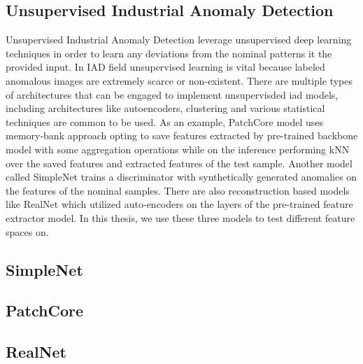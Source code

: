 \subsection{Unsupervised Industrial Anomaly Detection}
\label{unsupervised iad}

Unsupervised Industrial Anomaly Detection leverage unsupervised deep learning techniques in order to learn any deviations from the nominal patterns it the provided input. In IAD field unsupervised learning is vital because labeled anomalous images are extremely scarce or non-existent. There are multiple types of architectures that can be engaged to implement unsupervisded iad models, including architectures like autoencoders, clustering and various statistical techniques are common to be used. As an example, PatchCore model uses memory-bank approach opting to save features extracted by pre-trained backbone model with some aggregation operations while on the inference performing kNN over the saved features and extracted features of the test sample. Another model called SimpleNet trains a discriminator with synthetically generated anomalies on the features of the nominal samples. There are also reconstruction based models like RealNet which utilized auto-encoders on the layers of the pre-trained feature extractor model. In this thesis, we use these three models to test different feature spaces on.

\subsection{SimpleNet}
\label{simplenet}


\subsection{PatchCore}
\label{patchcore}


\subsection{RealNet}
\label{realnet}

